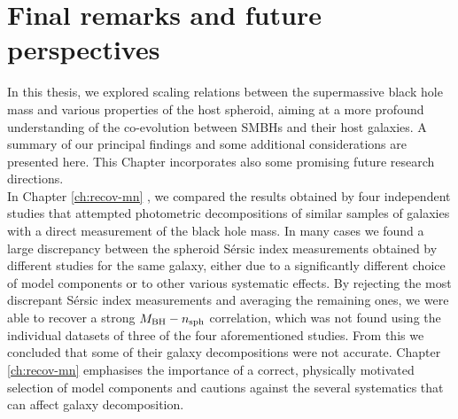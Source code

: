 \chapter{Final remarks and future perspectives}
\label{ch:concl}

In this thesis, we explored scaling relations between the supermassive black hole mass 
and various properties of the host spheroid, 
aiming at a more profound understanding of the co-evolution between SMBHs and their host galaxies. 
A summary of our principal findings and some additional considerations are presented here. 
This Chapter incorporates also some promising future research directions. \\

In Chapter \ref{ch:recov-mn} \citep{savorgnan2013}, we compared the results obtained by four independent studies 
\citep{grahamdriver2007,sani2011,vika2012,beifiori2012}
that attempted photometric decompositions of similar samples of galaxies with a direct measurement 
of the black hole mass. 
In many cases we found a large discrepancy between the spheroid S\'ersic index measurements 
obtained by different studies for the same galaxy, 
either due to a significantly different choice of model components 
or to other various systematic effects. 
By rejecting the most discrepant S\'ersic index measurements and averaging the remaining ones, 
we were able to recover a strong $M_{\rm BH} - n_{\rm sph}$ correlation, 
which was not found using the individual datasets of three of the four aforementioned studies. 
From this we concluded that some of their galaxy decompositions were not accurate. 
Chapter \ref{ch:recov-mn} emphasises the importance of a correct, physically motivated selection of model components 
and cautions against the several systematics that can affect galaxy decomposition. \\

